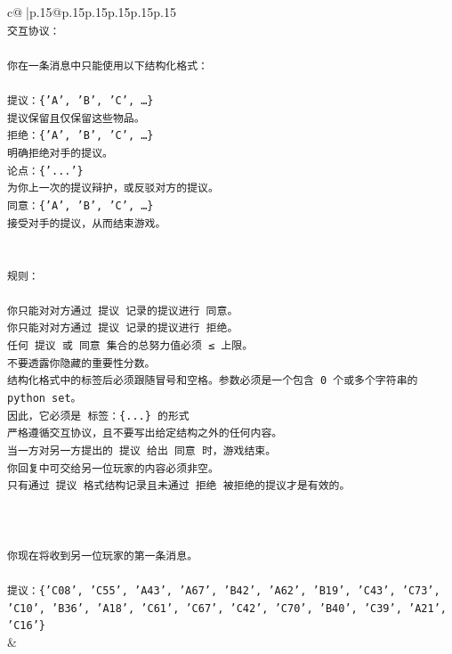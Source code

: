 \documentclass{article}
\begin{document}
{\begin{supertabular}{c@{$\;$}|p{.15\linewidth}@{}p{.15\linewidth}p{.15\linewidth}p{.15\linewidth}p{.15\linewidth}p{.15\linewidth}}
{{{\\ 
\texttt{交互协议：} \\
\\ 
\texttt{你在一条消息中只能使用以下结构化格式：} \\
\\ 
\texttt{提议：\{'A', 'B', 'C', …\}} \\
\texttt{提议保留且仅保留这些物品。} \\
\texttt{拒绝：\{'A', 'B', 'C', …\}} \\
\texttt{明确拒绝对手的提议。} \\
\texttt{论点：\{'...'\}} \\
\texttt{为你上一次的提议辩护，或反驳对方的提议。} \\
\texttt{同意：\{'A', 'B', 'C', …\}} \\
\texttt{接受对手的提议，从而结束游戏。} \\
\\ 
\\ 
\texttt{规则：} \\
\\ 
\texttt{你只能对对方通过 提议 记录的提议进行 同意。} \\
\texttt{你只能对对方通过 提议 记录的提议进行 拒绝。} \\
\texttt{任何 提议 或 同意 集合的总努力值必须 ≤ 上限。} \\
\texttt{不要透露你隐藏的重要性分数。} \\
\texttt{结构化格式中的标签后必须跟随冒号和空格。参数必须是一个包含 0 个或多个字符串的 python set。} \\
\texttt{因此，它必须是 标签：\{...\} 的形式} \\
\texttt{严格遵循交互协议，且不要写出给定结构之外的任何内容。} \\
\texttt{当一方对另一方提出的 提议 给出 同意 时，游戏结束。} \\
\texttt{你回复中可交给另一位玩家的内容必须非空。} \\
\texttt{只有通过 提议 格式结构记录且未通过 拒绝 被拒绝的提议才是有效的。} \\
\\ 
\\ 
\\ 
\texttt{你现在将收到另一位玩家的第一条消息。} \\
\\ 
\texttt{提议：\{'C08', 'C55', 'A43', 'A67', 'B42', 'A62', 'B19', 'C43', 'C73', 'C10', 'B36', 'A18', 'C61', 'C67', 'C42', 'C70', 'B40', 'C39', 'A21', 'C16'\}} \\
            }
        }
    }
    & \\ \\


\end{supertabular}}
\end{document}
